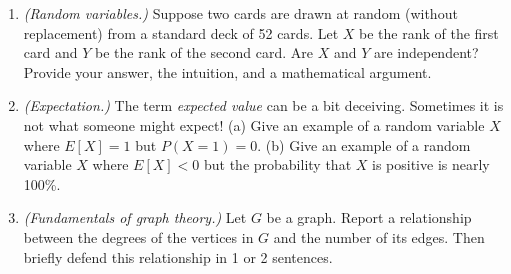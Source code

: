 \documentclass[10pt]{beamer}
\begin{document}
\begin{frame}
\small 
 \begin{myredbox}[title=\text{Weekly Quiz \#11}] 
\begin{enumerate}
\item \textit{(Random variables.)}   Suppose two cards are drawn at random (without replacement) from a standard deck of 52 cards. Let $X$ be the rank of the first card and $Y$ be the rank of the second card. Are $X$ and $Y$ are independent?  Provide your answer,  the intuition, and a mathematical argument. 
\item \textit{(Expectation.) } The term \textit{expected value} can be a bit deceiving. Sometimes it is not what someone might expect! (a) Give an example of a random variable $X$ where $E[X]=1$ but $P(X=1)=0$.  (b) Give an example of a random variable $X$ where $E[X]<0$ but the probability that $X$ is positive is nearly 100\%.
\item \textit{(Fundamentals of graph theory.)} Let $G$ be a graph. Report a relationship between the degrees of the vertices in $G$ and the number of its edges. Then briefly defend this relationship in 1 or 2 sentences.
\end{enumerate}
\end{myredbox}
\vfill 

%
\end{frame}

%
%
%	
\end{document}
